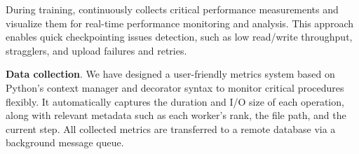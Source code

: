 During training, \sys{} continuously collects critical performance measurements and visualize them for real-time performance monitoring and analysis. This approach enables quick checkpointing issues detection, such as low read/write throughput, stragglers, and upload failures and retries.

\noindent \textbf{Data collection}.
We have designed a user-friendly metrics system based on Python's context manager and decorator syntax to monitor critical procedures flexibly.
It automatically captures the duration and I/O size of each operation, along with relevant metadata such as each worker's rank, the file path, and the current step.
All collected metrics are transferred to a remote database via a background message queue.

